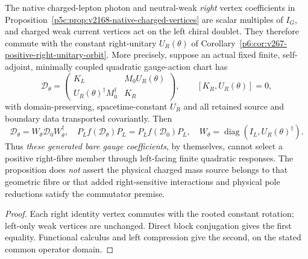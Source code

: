 \documentclass[12pt,a4paper]{article}
\begin{document}
\begin{proposition}
\label{p5c:prop:v267-native-gauge-right-fibre}
The native charged-lepton photon and neutral-weak \emph{right} vertex
coefficients in
Proposition~\ref{p5c:prop:v2168-native-charged-vertices}
are scalar multiples of $I_G$, and charged weak current vertices act
on the left chiral doublet.  They therefore commute with the constant
right-unitary $U_R(\theta)$ of
Corollary~\ref{p6:cor:v267-positive-right-unitary-orbit}.
More precisely, suppose an actual fixed finite, self-adjoint,
minimally coupled quadratic gauge-action chart has
\[
 \mathscr D_\theta=\begin{pmatrix}
 K_L&M_0U_R(\theta)\\
 U_R(\theta)^\dagger M_0^\dagger&K_R
 \end{pmatrix},\qquad [K_R,U_R(\theta)]=0,
\]
with domain-preserving, spacetime-constant $U_R$ and all retained
source and boundary data transported covariantly. Then
\[
 \boxed{\mathscr D_\theta=W_\theta\mathscr D_0W_\theta^\dagger,
 \quad P_Lf(\mathscr D_\theta)P_L=P_Lf(\mathscr D_0)P_L,\quad
 W_\theta=\operatorname{diag}(I_L,U_R(\theta)^\dagger).}
\]
Thus \emph{these generated bare gauge coefficients}, by themselves,
cannot select a positive right-fibre member through left-facing
finite quadratic responses.  The proposition does \emph{not} assert
the physical charged mass source belongs to that geometric fibre or
that added right-sensitive interactions and physical pole reductions
satisfy the commutator premise.
\end{proposition}
\begin{proof}
Each right identity vertex commutes with the rooted constant rotation;
left-only weak vertices are unchanged.  Direct block conjugation gives
the first equality.  Functional calculus and left compression give
the second, on the stated common operator domain.
\end{proof}
\end{document}
